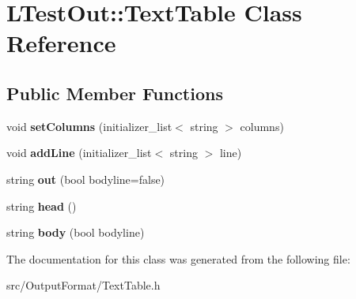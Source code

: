 \hypertarget{class_l_test_out_1_1_text_table}{\section{L\-Test\-Out\-:\-:Text\-Table Class Reference}
\label{class_l_test_out_1_1_text_table}
}
\subsection*{Public Member Functions}
\begin{DoxyCompactItemize}
\item 
\hypertarget{class_l_test_out_1_1_text_table_a5075240839c610d62bde2013f65c28d0}{void {\bfseries set\-Columns} (initializer\-\_\-list$<$ string $>$ columns)}\label{class_l_test_out_1_1_text_table_a5075240839c610d62bde2013f65c28d0}

\item 
\hypertarget{class_l_test_out_1_1_text_table_a97a6fb64fd7cdbff54de51c7af09ed00}{void {\bfseries add\-Line} (initializer\-\_\-list$<$ string $>$ line)}\label{class_l_test_out_1_1_text_table_a97a6fb64fd7cdbff54de51c7af09ed00}

\item 
\hypertarget{class_l_test_out_1_1_text_table_a8083c8a0a265434dac597f1f8ae40a50}{string {\bfseries out} (bool bodyline=false)}\label{class_l_test_out_1_1_text_table_a8083c8a0a265434dac597f1f8ae40a50}

\item 
\hypertarget{class_l_test_out_1_1_text_table_a55dad611e48bf2d99efeac1bd3b6ee1a}{string {\bfseries head} ()}\label{class_l_test_out_1_1_text_table_a55dad611e48bf2d99efeac1bd3b6ee1a}

\item 
\hypertarget{class_l_test_out_1_1_text_table_af300ffdd4f76a7b75be0c50f1265b357}{string {\bfseries body} (bool bodyline)}\label{class_l_test_out_1_1_text_table_af300ffdd4f76a7b75be0c50f1265b357}

\end{DoxyCompactItemize}


The documentation for this class was generated from the following file\-:\begin{DoxyCompactItemize}
\item 
src/\-Output\-Format/Text\-Table.\-h\end{DoxyCompactItemize}
